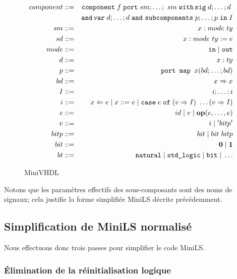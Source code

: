 \documentclass[a4paper]{article}
\newcommand{\minils}{{\sc MiniLS}}
\newcommand{\p}[0]{\; \vert \;}
\newcommand{\mybox}[1]{\mbox{\tt{#1}}}
\newcommand{\Coloneqq}[0]{::=}
\newcommand{\coloneqq}[0]{::=}
\newcommand{\Op}[2]{\mybox{\bf{op}}(#1,\dots,#2)}
\newcommand{\Assign}[2]{#1 \Leftarrow #2}
\newcommand{\Affect}[2]{#1 \coloneqq #2}
\newcommand{\Case}[5]{\mybox{case} \; #1 \; \mybox{of} \; (#2 \Rightarrow #3) \
  \dots (#4 \Rightarrow #5)}
\begin{document}
\begin{figure}[t]
  \centering
  \begin{eqnarray*}
    component & \Coloneqq & \mybox{component} \; f \; \mybox{port} \; sm;\dots;\
    sm \; \mybox{with} \, \mybox{sig} \; d; \dots; d \; \\
    & & \mybox{and} \, \mybox{var} \; d; \dots; d \; \mybox{and} \
    \mybox{subcomponents} \; p; \dots; p \; \mybox{in} \; I \\
    sm & \Coloneqq & x : mode \ ty \\
    sd & \Coloneqq & x : mode \ ty := e \\
    mode & \Coloneqq & \mybox{in} \p \mybox{out} \\
    d & \Coloneqq & x : ty \\
    p & \Coloneqq & \mybox{port map } x (bd;\dots;bd) \\
    bd & \Coloneqq & x \Rightarrow x \\
    I & \coloneqq & i; \dots; i \\
    i & \Coloneqq & \Assign{x}{e} \p \Affect{x}{e} \p \Case{e}{v}{I}{v}{I} \\
    e & \Coloneqq & id \; \vert \; v \; \vert \; \Op{e}{e} \\
    v & \Coloneqq & i \; \vert \; ' bitp ' \\
    bitp & \Coloneqq & bit \p bit \  bitp \\
    bit & \Coloneqq & \mathbf{0} \p \mathbf{1} \\
    bt & \Coloneqq & \mybox{natural} \p \mybox{std\_logic} \p \mybox{bit}
    \p \dots
  \end{eqnarray*}
  \caption{MiniVHDL}
  \label{fig:mvhdl}
\end{figure}

Notons que les param\`etres effectifs des sous-composants sont des noms de
signaux; cela justifie la forme simplifi\'ee \minils{} d\'ecrite pr\'ec\'edemment.

\subsection{Simplification de MiniLS normalis\'e}

Nous effectuons donc trois passes pour simplifier le code \minils.

\subsubsection{\'Elimination de la r\'einitialisation logique}
\end{document}
